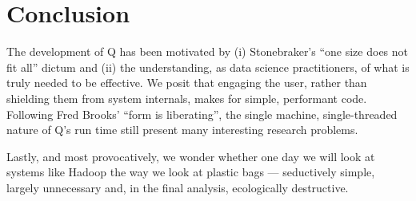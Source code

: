 \section{Conclusion}
\label{end}

The development of Q has been motivated by (i) 
Stonebraker's ``one size does not fit all'' dictum and (ii) the
understanding, as data science practitioners, of what is truly needed to be
effective. We posit that engaging the user, rather than shielding them from
system internals, makes for simple, performant code. 
Following Fred Brooks' ``form is liberating'', the single machine,
single-threaded nature of Q's run time still present many interesting research
problems. 

Lastly, and most provocatively, we wonder whether one day we will look at
systems like Hadoop the way we look at plastic bags --- seductively simple,
largely unnecessary and, in the final analysis, ecologically destructive.
